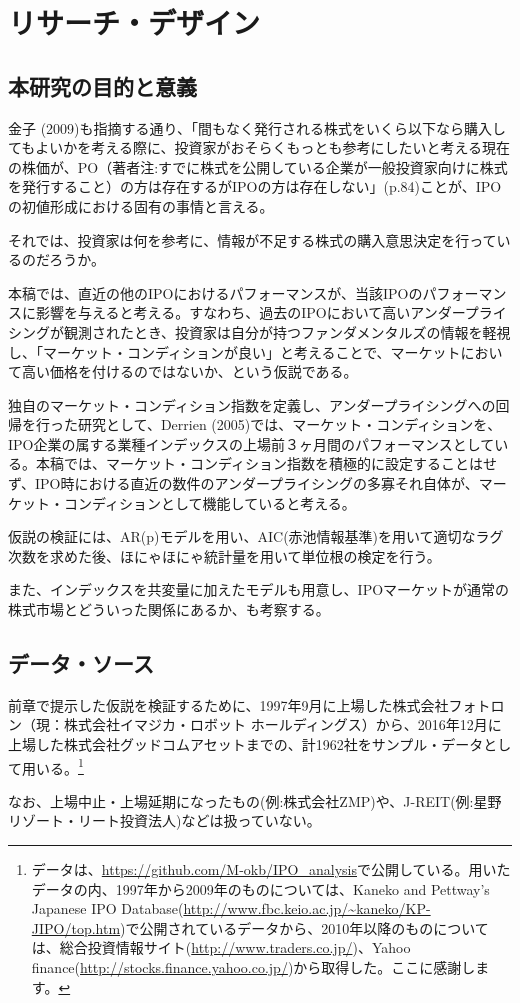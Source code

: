 \documentclass{jsarticle}
\begin{document}
\section{リサーチ・デザイン}
\subsection{本研究の目的と意義}
金子 (2009)\cite{kaneko}も指摘する通り、「間もなく発行される株式をいくら以下なら購入してもよいかを考える際に、投資家がおそらくもっとも参考にしたいと考える現在の株価が、PO（著者注:すでに株式を公開している企業が一般投資家向けに株式を発行すること）の方は存在するがIPOの方は存在しない」(p.84)ことが、IPOの初値形成における固有の事情と言える。\par
それでは、投資家は何を参考に、情報が不足する株式の購入意思決定を行っているのだろうか。\par
本稿では、直近の他のIPOにおけるパフォーマンスが、当該IPOのパフォーマンスに影響を与えると考える。すなわち、過去のIPOにおいて高いアンダープライシングが観測されたとき、投資家は自分が持つファンダメンタルズの情報を軽視し、「マーケット・コンディションが良い」と考えることで、マーケットにおいて高い価格を付けるのではないか、という仮説である。\par
独自のマーケット・コンディション指数を定義し、アンダープライシングへの回帰を行った研究として、Derrien (2005)\cite{Derrien}では、マーケット・コンディションを、IPO企業の属する業種インデックスの上場前３ヶ月間のパフォーマンスとしている。本稿では、マーケット・コンディション指数を積極的に設定することはせず、IPO時における直近の数件のアンダープライシングの多寡それ自体が、マーケット・コンディションとして機能していると考える。\par
仮説の検証には、AR(p)モデルを用い、AIC(赤池情報基準)を用いて適切なラグ次数を求めた後、ほにゃほにゃ統計量を用いて単位根の検定を行う。\par
また、インデックスを共変量に加えたモデルも用意し、IPOマーケットが通常の株式市場とどういった関係にあるか、も考察する。

\subsection{データ・ソース}
前章で提示した仮説を検証するために、1997年9月に上場した株式会社フォトロン（現：株式会社イマジカ・ロボット ホールディングス）から、2016年12月に上場した株式会社グッドコムアセットまでの、計1962社をサンプル・データとして用いる。\footnote[7]{データは、\url{https://github.com/M-okb/IPO_analysis}で公開している。用いたデータの内、1997年から2009年のものについては、Kaneko and Pettway’s Japanese IPO Database(\url{http://www.fbc.keio.ac.jp/~kaneko/KP-JIPO/top.htm})で公開されているデータから、2010年以降のものについては、総合投資情報サイト(\url{http://www.traders.co.jp/})、Yahoo finance(\url{http://stocks.finance.yahoo.co.jp/})から取得した。ここに感謝します。}\par
なお、上場中止・上場延期になったもの(例:株式会社ZMP)や、J-REIT(例:星野リゾート・リート投資法人)などは扱っていない。\par
\end{document}
